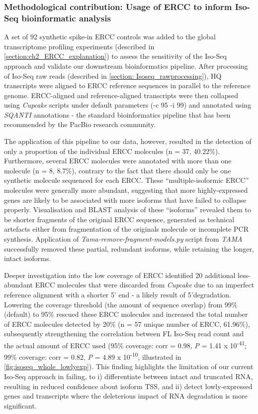 \newpage
\subsubsection{Methodological contribution: Usage of ERCC to inform Iso-Seq bioinformatic analysis}
\label{ercc_development}
A set of 92 synthetic spike-in ERCC controls was added to the global transcriptome profiling experiments (described in \cref{section:ch2_ERCC_explanation}) to assess the sensitivity of the Iso-Seq approach and validate our downstream bioinformatics pipeline. After processing of Iso-Seq raw reads (described in \cref{section: Isoseq_rawprocessing}), HQ transcripts were aligned to ERCC reference sequences in parallel to the reference genome. ERCC-aligned and reference-aligned transcripts were then collapsed using \textit{Cupcake} scripts under default parameters (-c 95 -i 99) and annotated using \textit{SQANTI} annotations - the standard bioinformatics pipeline that has been recommended by the PacBio research community. 

The application of this pipeline to our data, however, resulted in the detection of only a proportion of the individual ERCC molecules (n = 37, 40.22\%). Furthermore, several ERCC molecules were annotated with more than one molecule (n = 8, 8.7\%), contrary to the fact that there should only be one synthetic molecule sequenced for each ERCC. These “multiple-isoformic ERCC” molecules were generally more abundant, suggesting that more highly-expressed genes are likely to be associated with more isoforms that have failed to collapse properly. Visualisation and BLAST analysis of these “isoforms” revealed them to be shorter fragments of the original ERCC sequence, generated as technical artefacts either from fragmentation of the originals molecule or incomplete PCR synthesis. Application of \textit{Tama-remove-fragment-models.py} script from \textit{TAMA}\cite{Kuo2017} successfully removed these partial, redundant isoforms, while retaining the longer, intact isoforms. 

Deeper investigation into the low coverage of ERCC identified  20 additional less-abundant ERCC molecules that were discarded from \textit{Cupcake} due to an imperfect reference alignment with a shorter 5' end - a likely result of 5'degradation. Lowering the coverage threshold (the amount of sequence overlap) from 99\% (default) to 95\% rescued these ERCC molecules and increased the total number of ERCC molecules detected by 20\% (n = 57 unique number of ERCC, 61.96\%), subsequently strengthening the correlation between FL Iso-Seq read count and the actual amount of ERCC used (95\% coverage: corr = 0.98, \textit{P} = 1.41 x 10\textsuperscript{-41}; 99\% coverage: corr = 0.82, \textit{P} = 4.89 x 10\textsuperscript{-10}, illustrated in \cref{fig:isoseq_whole_lowlyexp}). This finding highlights the limitation of our current Iso-Seq approach in failing, to i) differentiate between intact and truncated RNA, resulting in reduced confidence about isoform TSS, and ii) detect lowly-expressed genes and transcripts where the deleterious impact of RNA degradation is more significant. 